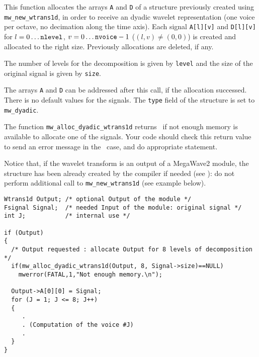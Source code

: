 \newpage %

\Description
This function allocates the arrays \verb+A+ and \verb+D+ of a \wtransud structure previously created using \verb+mw_new_wtrans1d+, in order to receive
an dyadic wavelet representation (one voice per octave, no decimation along the time axis).
Each signal \verb+A[l][v]+ and \verb+D[l][v]+ for $l=0 \ldots \mbox{{\tt nlevel}}$, $v=0 \ldots \mbox{{\tt nvoice}}-1$ ($(l,v) \not = (0,0)$) is created and
allocated to the right size.
Previously allocations are deleted, if any.

The number of levels for the decomposition is given by \verb+level+ and the
size of the original signal is given by \verb+size+.

The arrays \verb+A+ and \verb+D+ can be addressed after this call, if the allocation successed. There is no default values for the signals.
The \verb+type+ field of the \wtransud structure is set to \verb+mw_dyadic+.

The function \verb+mw_alloc_dyadic_wtrans1d+ returns \Null\ if not enough memory is available to allocate one of the signals. 
Your code should check this return value to send an error message in the \Null\ case, and do appropriate statement.

Notice that, if the wavelet transform is an output of a MegaWave2 module, the structure has been already created by the compiler if needed (see \volI): do not perform additional call to \verb+mw_new_wtrans1d+ (see example below).

\Next
\Example
\begin{verbatim}
Wtrans1d Output; /* optional Output of the module */
Fsignal Signal;  /* needed Input of the module: original signal */
int J;           /* internal use */

if (Output) 
{
  /* Output requested : allocate Output for 8 levels of decomposition */
  if(mw_alloc_dyadic_wtrans1d(Output, 8, Signal->size)==NULL)
    mwerror(FATAL,1,"Not enough memory.\n");
  
  Output->A[0][0] = Signal;
  for (J = 1; J <= 8; J++)
  {
     .
     . (Computation of the voice #J)
     .
  }
}
\end{verbatim}

